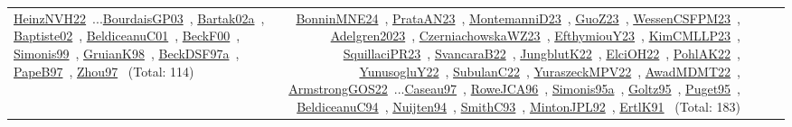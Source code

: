 {\begin{longtable}{p{3cm}r>{\raggedright\arraybackslash}p{6cm}>{\raggedright\arraybackslash}p{6cm}>{\raggedright\arraybackslash}p{8cm}}
\href{../works/HeinzNVH22.pdf}{HeinzNVH22}~\cite{HeinzNVH22}...\href{../works/BourdaisGP03.pdf}{BourdaisGP03}~\cite{BourdaisGP03}, \href{../works/Bartak02a.pdf}{Bartak02a}~\cite{Bartak02a}, \href{../works/Baptiste02.pdf}{Baptiste02}~\cite{Baptiste02}, \href{../works/BeldiceanuC01.pdf}{BeldiceanuC01}~\cite{BeldiceanuC01}, \href{../works/BeckF00.pdf}{BeckF00}~\cite{BeckF00}, \href{../works/Simonis99.pdf}{Simonis99}~\cite{Simonis99}, \href{../works/GruianK98.pdf}{GruianK98}~\cite{GruianK98}, \href{../works/BeckDSF97a.pdf}{BeckDSF97a}~\cite{BeckDSF97a}, \href{../works/PapeB97.pdf}{PapeB97}~\cite{PapeB97}, \href{../works/Zhou97.pdf}{Zhou97}~\cite{Zhou97} (Total: 114) & \href{../works/BonninMNE24.pdf}{BonninMNE24}~\cite{BonninMNE24}, \href{../works/PrataAN23.pdf}{PrataAN23}~\cite{PrataAN23}, \href{../works/MontemanniD23.pdf}{MontemanniD23}~\cite{MontemanniD23}, \href{../works/GuoZ23.pdf}{GuoZ23}~\cite{GuoZ23}, \href{../works/WessenCSFPM23.pdf}{WessenCSFPM23}~\cite{WessenCSFPM23}, \href{../works/Adelgren2023.pdf}{Adelgren2023}~\cite{Adelgren2023}, \href{../works/CzerniachowskaWZ23.pdf}{CzerniachowskaWZ23}~\cite{CzerniachowskaWZ23}, \href{../works/EfthymiouY23.pdf}{EfthymiouY23}~\cite{EfthymiouY23}, \href{../works/KimCMLLP23.pdf}{KimCMLLP23}~\cite{KimCMLLP23}, \href{../works/SquillaciPR23.pdf}{SquillaciPR23}~\cite{SquillaciPR23}, \href{../works/SvancaraB22.pdf}{SvancaraB22}~\cite{SvancaraB22}, \href{../works/JungblutK22.pdf}{JungblutK22}~\cite{JungblutK22}, \href{../works/ElciOH22.pdf}{ElciOH22}~\cite{ElciOH22}, \href{../works/PohlAK22.pdf}{PohlAK22}~\cite{PohlAK22}, \href{../works/YunusogluY22.pdf}{YunusogluY22}~\cite{YunusogluY22}, \href{../works/SubulanC22.pdf}{SubulanC22}~\cite{SubulanC22}, \href{../works/YuraszeckMPV22.pdf}{YuraszeckMPV22}~\cite{YuraszeckMPV22}, \href{../works/AwadMDMT22.pdf}{AwadMDMT22}~\cite{AwadMDMT22}, \href{../works/ArmstrongGOS22.pdf}{ArmstrongGOS22}~\cite{ArmstrongGOS22}...\href{../works/Caseau97.pdf}{Caseau97}~\cite{Caseau97}, \href{../works/RoweJCA96.pdf}{RoweJCA96}~\cite{RoweJCA96}, \href{../works/Simonis95a.pdf}{Simonis95a}~\cite{Simonis95a}, \href{../works/Goltz95.pdf}{Goltz95}~\cite{Goltz95}, \href{../works/Puget95.pdf}{Puget95}~\cite{Puget95}, \href{../works/BeldiceanuC94.pdf}{BeldiceanuC94}~\cite{BeldiceanuC94}, \href{../works/Nuijten94.pdf}{Nuijten94}~\cite{Nuijten94}, \href{../works/SmithC93.pdf}{SmithC93}~\cite{SmithC93}, \href{../works/MintonJPL92.pdf}{MintonJPL92}~\cite{MintonJPL92}, \href{../works/ErtlK91.pdf}{ErtlK91}~\cite{ErtlK91} (Total: 183)\\

\end{longtable}}
